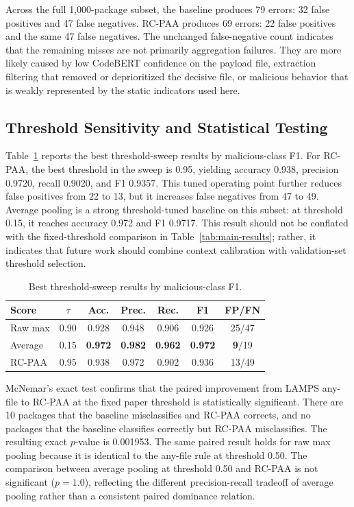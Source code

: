 \documentclass[conference,a4paper]{IEEEtran}
\newcommand{\rcpaa}{RC-PAA}
\newcommand{\codebert}{CodeBERT}
\begin{document}
Across the full 1,000-package subset, the baseline produces 79 errors: 32 false
positives and 47 false negatives. \rcpaa{} produces 69 errors: 22 false positives and
the same 47 false negatives. The unchanged false-negative count indicates that the
remaining misses are not primarily aggregation failures. They are more likely caused
by low \codebert{} confidence on the payload file, extraction filtering that removed
or deprioritized the decisive file, or malicious behavior that is weakly represented
by the static indicators used here.

\subsection{Threshold Sensitivity and Statistical Testing}
Table~\ref{tab:thresholds} reports the best threshold-sweep results by malicious-class
F1. For \rcpaa{}, the best threshold in the sweep is 0.95, yielding accuracy 0.938,
precision 0.9720, recall 0.9020, and F1 0.9357. This tuned operating point further
reduces false positives from 22 to 13, but it increases false negatives from 47 to 49.
Average pooling is a strong threshold-tuned baseline on this subset: at threshold 0.15,
it reaches accuracy 0.972 and F1 0.9717. This result should not be conflated with the
fixed-threshold comparison in Table~\ref{tab:main-results}; rather, it indicates that
future work should combine context calibration with validation-set threshold selection.

\begin{table}[t]
\centering
\caption{Best threshold-sweep results by malicious-class F1.}
\label{tab:thresholds}
\tiny
\setlength{\tabcolsep}{3pt}
\begin{tabular}{lcccccc}
\toprule
Score & $\tau$ & Acc. & Prec. & Rec. & F1 & FP/FN \\
\midrule
Raw max      & 0.90 & 0.928 & 0.948 & 0.906 & 0.926 & 25/47 \\
Average      & 0.15 & \textbf{0.972} & \textbf{0.982} & \textbf{0.962} & \textbf{0.972} & \textbf{9}/19 \\
\rcpaa{}     & 0.95 & 0.938 & 0.972 & 0.902 & 0.936 & 13/49 \\
\bottomrule
\end{tabular}
\end{table}

McNemar's exact test confirms that the paired improvement from LAMPS any-file to
\rcpaa{} at the fixed paper threshold is statistically significant. There are 10
packages that the baseline misclassifies and \rcpaa{} corrects, and no packages that
the baseline classifies correctly but \rcpaa{} misclassifies. The resulting exact
$p$-value is 0.001953. The same paired result holds for raw max pooling because it is
identical to the any-file rule at threshold 0.50. The comparison between average
pooling at threshold 0.50 and \rcpaa{} is not significant ($p=1.0$), reflecting the
different precision-recall tradeoff of average pooling rather than a consistent paired
dominance relation.
\end{document}
